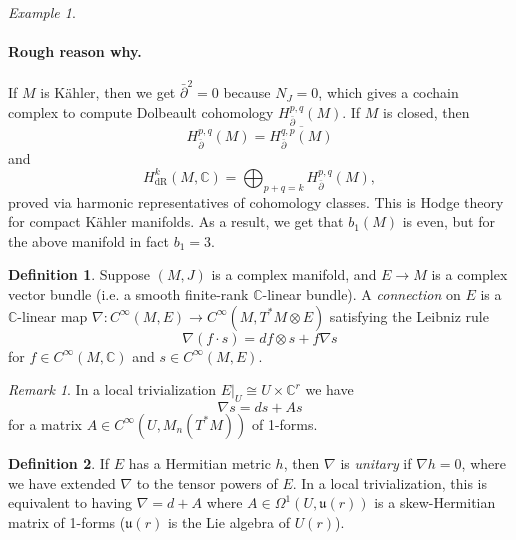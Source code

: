 \documentclass[a4paper]{article}
\theoremstyle{definition}
\newtheorem*{definition}{Definition}
\theoremstyle{remark}
\newtheorem*{example}{Example}
\newtheorem*{remark}{Remark}
\newcommand{\dR}{\text{dR}}
\renewcommand{\u}{\mathfrak{u}}
\newcommand{\C}{\mathbb{C}}
\begin{document}
\begin{example}
\begin{itemize}
            \paragraph{Rough reason why.} If $M$ is K\"ahler, then we get
            $\bar\partial^2=0$ because $N_J=0$, which gives a cochain complex to
            compute Dolbeault cohomology $H^{p,q}_{\bar\partial}(M)$. If $M$ is
            closed, then
            \begin{equation*}
                H^{p,q}_{\bar\partial}(M)
                    = \overline{H^{q,p}_{\bar\partial}(M)}
            \end{equation*}
            and
            \begin{equation*}
                H^k_\dR(M,\C) = \bigoplus_{p+q=k}H^{p,q}_{\bar\partial}(M),
            \end{equation*}
            proved via harmonic representatives of cohomology classes. This is
            Hodge theory for compact K\"ahler manifolds. As a result, we get
            that $b_1(M)$ is even, but for the above manifold in fact $b_1=3$.
    \end{itemize}
\end{example}

\begin{definition}
    Suppose $(M,J)$ is a complex manifold, and $E\to M$ is a complex vector
    bundle (i.e. a smooth finite-rank $\C$-linear bundle). A \emph{connection}
    on $E$ is a $\C$-linear map
    $\nabla:C^\infty(M,E)\to C^\infty(M,T^*M\otimes E)$ satisfying the Leibniz
    rule
    \begin{equation*}
        \nabla(f\cdot s) = df\otimes s + f\nabla s
    \end{equation*}
    for $f\in C^\infty(M,\C)$ and $s\in C^\infty(M,E)$.
\end{definition}

\begin{remark}
    In a local trivialization $E|_U\cong U\times\C^r$ we have
    \begin{equation*}
        \nabla s = ds + As
    \end{equation*}
    for a matrix $A\in C^\infty(U,M_n(T^*M))$ of 1-forms.
\end{remark}

\begin{definition}
    If $E$ has a Hermitian metric $h$, then $\nabla$ is \emph{unitary} if
    $\nabla h=0$, where we have extended $\nabla$ to the tensor powers of $E$.
    In a local trivialization, this is equivalent to having $\nabla=d+A$ where
    $A\in\Omega^1(U,\u(r))$ is a skew-Hermitian matrix of 1-forms ($\u(r)$ is
    the Lie algebra of $U(r)$).
\end{definition}
\end{document}
